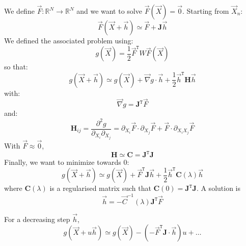 \documentclass[aps,12pt]{revtex4}
\newcommand{\trn}[1]{{#1}^{\mathtt{T}}}
\begin{document}
We define $\vec{F} : \mathbb{R}^N \rightarrow \mathbb{R}^N$ and we want to solve $\vec{F}(\vec{X})=\vec{0}$.
Starting from $\vec{X}_n$:
\begin{equation}
	\vec{F}(\vec{X} + \vec{h}) \simeq \vec{F} + \bm{J} \vec{h}
\end{equation}
We defined the associated problem using:
\begin{equation}
	g(\vec{X}) = \frac{1}{2} \trn{\vec{F}} W \vec{F} (\vec{X}) 
\end{equation}
so that:
\begin{equation}
	g(\vec{X}+\vec{h}) \simeq g(\vec{X}) + \vec{\nabla}g \cdot \vec{h} + \frac{1}{2} \trn{\vec{h}} \bm{H} \vec{h}
\end{equation}
with:
\begin{equation}
	\vec{\nabla}g =  \trn{\bm{J}} \vec{F}
\end{equation}
and:
\begin{equation}
	\bm{H}_{ij} = \dfrac{\partial^2 g}{\partial_{X_i}\partial_{X_j}} = \partial_{X_i} \vec{F} \cdot \partial_{X_j} \vec{F} + \vec{F} \cdot \partial_{X_iX_j} \vec{F}
\end{equation}
With $\vec{F}\approx\vec0$,
\begin{equation}
	\bm{H} \simeq \bm{C}  = \trn{\bm{J}} \bm{J}
\end{equation}
Finally, we want to minimize towards $0$:
\begin{equation}
	g(\vec{X} +\vec{h}) \simeq g(\vec{X}) + \trn{\vec{F}} \bm{J}  \vec{h} + \frac{1}{2} \trn{\vec{h}} \bm{C} (\lambda) \vec{h}
\end{equation}
where $\bm{C}(\lambda)$ is a regularised matrix such that $\bm{C}(0)=\trn{\bm{J}}\bm{J}$.
A solution is
\begin{equation}
	\vec{h} = -\vec{C}^{-1}(\lambda) \trn{\bm{J}} \vec{F}
\end{equation}

For a decreasing step $\vec{h}$, 
\begin{equation}
	g(\vec{X}+u\vec{h}) \simeq g(\vec{X}) - (-\trn{\vec{F}} \bm{J} \cdot \vec{h}) u + \ldots
\end{equation}
\end{document}

